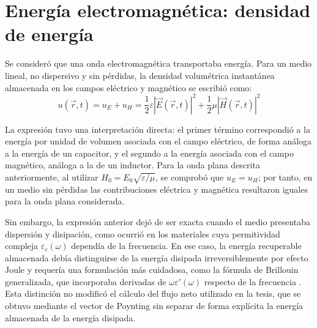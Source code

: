 \section{Energía electromagnética: densidad de energía}
Se consideró que una onda electromagnética transportaba energía. Para un medio lineal, no dispersivo y sin pérdidas, la densidad volumétrica instantánea almacenada en los campos eléctrico y magnético se escribió como:
\begin{equation}
    u(\vec{r}, t) = u_E + u_H = \frac{1}{2}\varepsilon|\vec{E}(\vec{r}, t)|^2 + \frac{1}{2}\mu|\vec{H}(\vec{r}, t)|^2
\end{equation}

La expresión tuvo una interpretación directa: el primer término correspondió a la energía por unidad de volumen asociada con el campo eléctrico, de forma análoga a la energía de un capacitor, y el segundo a la energía asociada con el campo magnético, análoga a la de un inductor. Para la onda plana descrita anteriormente, al utilizar $H_0=E_0\sqrt{\varepsilon/\mu}$, se comprobó que $u_E=u_H$; por tanto, en un medio sin pérdidas las contribuciones eléctrica y magnética resultaron iguales para la onda plana considerada.

Sin embargo, la expresión anterior dejó de ser exacta cuando el medio presentaba dispersión y disipación, como ocurrió en los materiales cuya permitividad compleja $\varepsilon_c(\omega)$ dependía de la frecuencia. En ese caso, la energía recuperable almacenada debía distinguirse de la energía disipada irreversiblemente por efecto Joule y requería una formulación más cuidadosa, como la fórmula de Brillouin generalizada, que incorporaba derivadas de $\omega\varepsilon'(\omega)$ respecto de la frecuencia \cite{Philbin2011}. Esta distinción no modificó el cálculo del flujo neto utilizado en la tesis, que se obtuvo mediante el vector de Poynting sin separar de forma explícita la energía almacenada de la energía disipada.

